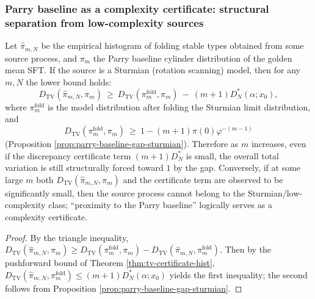 \subsubsection{Parry baseline as a complexity certificate: structural separation from low-complexity sources}
\begin{corollary}[Folding histogram \texorpdfstring{$\Rightarrow$}{=>} complexity certificate]\label{cor:pom-parry-complexity-detector}
Let \(\hat{\pi}_{m,N}\) be the empirical histogram of folding stable types obtained from some source process, and \(\pi_m\) the Parry baseline cylinder distribution of the golden mean SFT.
If the source is a Sturmian (rotation scanning) model, then for any \(m,N\) the lower bound holds:
$$
D_{\mathrm{TV}}(\hat{\pi}_{m,N},\pi_m)
\ \ge\
D_{\mathrm{TV}}(\pi_m^{\mathrm{fold}},\pi_m)\ -\ (m+1)D_N^*(\alpha;x_0),
$$
where \(\pi_m^{\mathrm{fold}}\) is the model distribution after folding the Sturmian limit distribution, and
$$
D_{\mathrm{TV}}(\pi_m^{\mathrm{fold}},\pi_m)\ \ge\ 1-(m+1)\pi(0)\varphi^{-(m-1)}
$$
(Proposition \ref{prop:parry-baseline-gap-sturmian}).
Therefore as \(m\) increases, even if the discrepancy certificate term \((m+1)D_N^*\) is small, the overall total variation is still structurally forced toward \(1\) by the gap.
Conversely, if at some large \(m\) both \(D_{\mathrm{TV}}(\hat{\pi}_{m,N},\pi_m)\) and the certificate term are observed to be significantly small, then the source process cannot belong to the Sturmian/low-complexity class; ``proximity to the Parry baseline'' logically serves as a complexity certificate.
\end{corollary}
\begin{proof}
By the triangle inequality,
\(
D_{\mathrm{TV}}(\hat{\pi}_{m,N},\pi_m)\ge D_{\mathrm{TV}}(\pi_m^{\mathrm{fold}},\pi_m)-D_{\mathrm{TV}}(\hat{\pi}_{m,N},\pi_m^{\mathrm{fold}})
\).
Then by the pushforward bound of Theorem \ref{thm:tv-certificate-hist},
\(
D_{\mathrm{TV}}(\hat{\pi}_{m,N},\pi_m^{\mathrm{fold}})\le (m+1)D_N^*(\alpha;x_0)
\)
yields the first inequality; the second follows from Proposition \ref{prop:parry-baseline-gap-sturmian}.
\end{proof}

